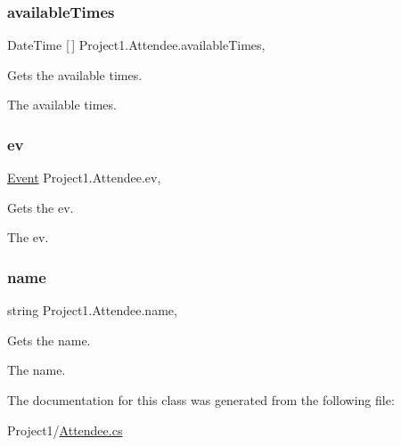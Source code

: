 \subsubsection{\texorpdfstring{available\+Times}{availableTimes}}
{\footnotesize\ttfamily Date\+Time \mbox{[}$\,$\mbox{]} Project1.\+Attendee.\+available\+Times\hspace{0.3cm}{\ttfamily [get]}, {}}



Gets the available times. 

The available times. \mbox{\label{classProject1_1_1Attendee_ad47df6573b4cb7b6dbd6ae35751abdc2}} 
\subsubsection{\texorpdfstring{ev}{ev}}
{\footnotesize\ttfamily \hyperlink{classProject1_1_1Event}{Event} Project1.\+Attendee.\+ev\hspace{0.3cm}{\ttfamily [get]}, {}}



Gets the ev. 

The ev. \mbox{\label{classProject1_1_1Attendee_a5ccf26d80354941e9c4a80157b9fb6c9}} 
\subsubsection{\texorpdfstring{name}{name}}
{\footnotesize\ttfamily string Project1.\+Attendee.\+name\hspace{0.3cm}{\ttfamily [get]}, {}}



Gets the name. 

The name. 

The documentation for this class was generated from the following file\+:\begin{DoxyCompactItemize}
\item 
Project1/\hyperlink{Attendee_8cs}{Attendee.\+cs}\end{DoxyCompactItemize}
